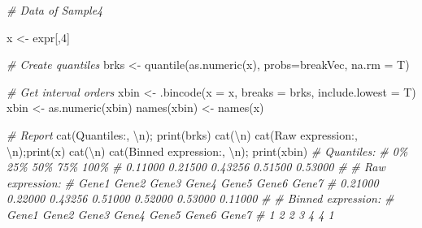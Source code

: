 \documentclass[
  12pt,
]{book}
\newenvironment{Shaded}{\begin{snugshade}}{\end{snugshade}}
\newcommand{\AttributeTok}[1]{\textcolor[rgb]{0.77,0.63,0.00}{#1}}
\newcommand{\CommentTok}[1]{\textcolor[rgb]{0.56,0.35,0.01}{\textit{#1}}}
\newcommand{\DecValTok}[1]{\textcolor[rgb]{0.00,0.00,0.81}{#1}}
\newcommand{\FunctionTok}[1]{\textcolor[rgb]{0.00,0.00,0.00}{#1}}
\newcommand{\NormalTok}[1]{#1}
\newcommand{\OtherTok}[1]{\textcolor[rgb]{0.56,0.35,0.01}{#1}}
\newcommand{\SpecialCharTok}[1]{\textcolor[rgb]{0.00,0.00,0.00}{#1}}
\newcommand{\StringTok}[1]{\textcolor[rgb]{0.31,0.60,0.02}{#1}}
\begin{document}
\begin{Shaded}
\begin{Highlighting}[]

\CommentTok{\# Data of Sample4}

\NormalTok{x }\OtherTok{\textless{}{-}}\NormalTok{ expr[,}\DecValTok{4}\NormalTok{]}

\CommentTok{\# Create quantiles  }
\NormalTok{brks }\OtherTok{\textless{}{-}} \FunctionTok{quantile}\NormalTok{(}\FunctionTok{as.numeric}\NormalTok{(x), }
                 \AttributeTok{probs=}\NormalTok{breakVec, }
                 \AttributeTok{na.rm =}\NormalTok{ T)}

\CommentTok{\# Get interval orders}
\NormalTok{xbin }\OtherTok{\textless{}{-}} \FunctionTok{.bincode}\NormalTok{(}\AttributeTok{x =}\NormalTok{ x, }
                 \AttributeTok{breaks =}\NormalTok{ brks, }
                 \AttributeTok{include.lowest =}\NormalTok{ T)}
\NormalTok{xbin }\OtherTok{\textless{}{-}} \FunctionTok{as.numeric}\NormalTok{(xbin)}
\FunctionTok{names}\NormalTok{(xbin) }\OtherTok{\textless{}{-}} \FunctionTok{names}\NormalTok{(x)}

\CommentTok{\# Report}
\FunctionTok{cat}\NormalTok{(}\StringTok{\textquotesingle{}Quantiles:\textquotesingle{}}\NormalTok{, }\StringTok{\textquotesingle{}}\SpecialCharTok{\textbackslash{}n}\StringTok{\textquotesingle{}}\NormalTok{); }\FunctionTok{print}\NormalTok{(brks)}
\FunctionTok{cat}\NormalTok{(}\StringTok{\textquotesingle{}}\SpecialCharTok{\textbackslash{}n}\StringTok{\textquotesingle{}}\NormalTok{)}
\FunctionTok{cat}\NormalTok{(}\StringTok{\textquotesingle{}Raw expression:\textquotesingle{}}\NormalTok{, }\StringTok{\textquotesingle{}}\SpecialCharTok{\textbackslash{}n}\StringTok{\textquotesingle{}}\NormalTok{);}\FunctionTok{print}\NormalTok{(x)}
\FunctionTok{cat}\NormalTok{(}\StringTok{\textquotesingle{}}\SpecialCharTok{\textbackslash{}n}\StringTok{\textquotesingle{}}\NormalTok{)}
\FunctionTok{cat}\NormalTok{(}\StringTok{\textquotesingle{}Binned expression:\textquotesingle{}}\NormalTok{, }\StringTok{\textquotesingle{}}\SpecialCharTok{\textbackslash{}n}\StringTok{\textquotesingle{}}\NormalTok{); }\FunctionTok{print}\NormalTok{(xbin)}
\CommentTok{\# Quantiles: }
\CommentTok{\#      0\%     25\%     50\%     75\%    100\% }
\CommentTok{\# 0.11000 0.21500 0.43256 0.51500 0.53000 }
\CommentTok{\# }
\CommentTok{\# Raw expression: }
\CommentTok{\#   Gene1   Gene2   Gene3   Gene4   Gene5   Gene6   Gene7 }
\CommentTok{\# 0.21000 0.22000 0.43256 0.51000 0.52000 0.53000 0.11000 }
\CommentTok{\# }
\CommentTok{\# Binned expression: }
\CommentTok{\# Gene1 Gene2 Gene3 Gene4 Gene5 Gene6 Gene7 }
\CommentTok{\#     1     2     2     3     4     4     1}
\end{Highlighting}
\end{Shaded}
\end{document}
